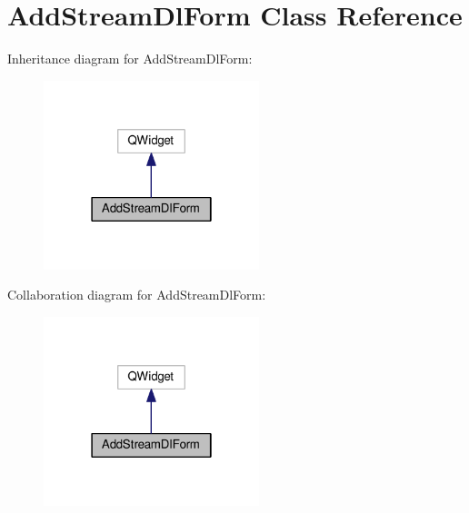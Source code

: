 \hypertarget{class_add_stream_dl_form}{}\section{Add\+Stream\+Dl\+Form Class Reference}
\label{class_add_stream_dl_form}


Inheritance diagram for Add\+Stream\+Dl\+Form\+:
\nopagebreak
\begin{figure}[H]
\begin{center}
\leavevmode
\includegraphics[width=178pt]{class_add_stream_dl_form__inherit__graph}
\end{center}
\end{figure}


Collaboration diagram for Add\+Stream\+Dl\+Form\+:
\nopagebreak
\begin{figure}[H]
\begin{center}
\leavevmode
\includegraphics[width=178pt]{class_add_stream_dl_form__coll__graph}
\end{center}
\end{figure}
